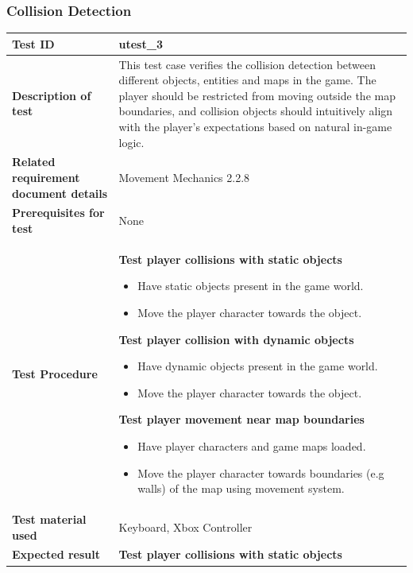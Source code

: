 \documentclass[11pt, a4paper]{article}
\begin{document}
\newpage

\subsubsection{Collision Detection}

\begin{center}
\begin{tabularx}{\linewidth}{|>{\raggedright\arraybackslash}m{4cm}|X|}
    \hline
    \textbf{Test ID} & utest\_3 \\
    \hline
    \textbf{Description of test} & This test case verifies the collision detection between different objects, entities and maps in the game. The player should be restricted from moving outside the map boundaries, and collision objects should intuitively align with the player’s expectations based on natural in-game logic. \\
    \hline
    \textbf{Related requirement document details} & Movement Mechanics 2.2.8 \\
    \hline
    \textbf{Prerequisites for test} & None \\
    \hline
    \textbf{Test Procedure} &
    \textbf{Test player collisions with static objects}
    \begin{itemize}
        \item Have static objects present in the game world.
        \item Move the player character towards the object.
    \end{itemize}
    \textbf{Test player collision with dynamic objects}
    \begin{itemize}
        \item Have dynamic objects present in the game world.
        \item Move the player character towards the object.
    \end{itemize}
    \textbf{Test player movement near map boundaries}
    \begin{itemize}
        \item Have player characters and game maps loaded.
        \item Move the player character towards boundaries (e.g walls) of the map using movement system.
    \end{itemize}
    \\
    \hline
    \textbf{Test material used} & Keyboard, Xbox Controller \\
    \hline
    \textbf{Expected result} &
    \textbf{Test player collisions with static objects}

\end{tabularx}
\end{center}
\end{document}

